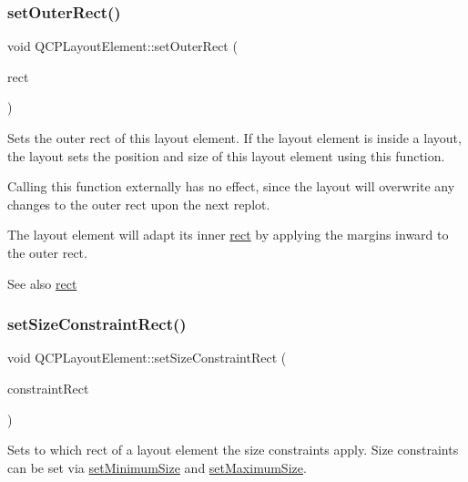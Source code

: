\subsubsection{\texorpdfstring{set\+Outer\+Rect()}{setOuterRect()}}
{\footnotesize\ttfamily void Q\+C\+P\+Layout\+Element\+::set\+Outer\+Rect (\begin{DoxyParamCaption}\item[{const Q\+Rect \&}]{rect }\end{DoxyParamCaption})}

Sets the outer rect of this layout element. If the layout element is inside a layout, the layout sets the position and size of this layout element using this function.

Calling this function externally has no effect, since the layout will overwrite any changes to the outer rect upon the next replot.

The layout element will adapt its inner \hyperlink{classQCPLayoutElement_a208effccfe2cca4a0eaf9393e60f2dd4}{rect} by applying the margins inward to the outer rect.

\begin{DoxySeeAlso}{See also}
\hyperlink{classQCPLayoutElement_a208effccfe2cca4a0eaf9393e60f2dd4}{rect} 
\end{DoxySeeAlso}
\mbox{\label{classQCPLayoutElement_a361666cdcc6fbfd37344cc44be746b0f}} 
\subsubsection{\texorpdfstring{set\+Size\+Constraint\+Rect()}{setSizeConstraintRect()}}
{\footnotesize\ttfamily void Q\+C\+P\+Layout\+Element\+::set\+Size\+Constraint\+Rect (\begin{DoxyParamCaption}\item[{\hyperlink{classQCPLayoutElement_a0afb3e5773529e4bd20e448f81be4d2a}{Size\+Constraint\+Rect}}]{constraint\+Rect }\end{DoxyParamCaption})}

Sets to which rect of a layout element the size constraints apply. Size constraints can be set via \hyperlink{classQCPLayoutElement_a5dd29a3c8bc88440c97c06b67be7886b}{set\+Minimum\+Size} and \hyperlink{classQCPLayoutElement_a74eb5280a737ab44833d506db65efd95}{set\+Maximum\+Size}.

